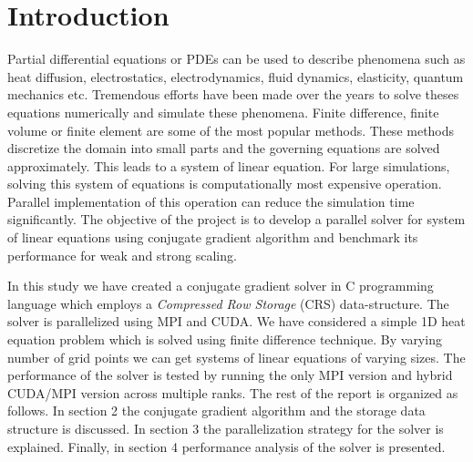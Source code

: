 \documentclass[sigplan,screen]{acmart}
\begin{document}


\maketitle

\section{Introduction}
Partial differential equations or PDEs can be used to describe phenomena such as heat diffusion, electrostatics, electrodynamics, fluid dynamics, elasticity, quantum mechanics etc. Tremendous efforts have been made over the years to solve theses equations numerically and simulate these phenomena. Finite difference, finite volume or finite element are some of the most popular methods. These methods discretize the domain into small parts and the governing equations are solved approximately. This leads to a system of linear equation. For large simulations, solving this system of equations is computationally most expensive operation. Parallel implementation of this operation can reduce the simulation time significantly. The objective of the project is to develop a parallel solver for system of linear equations using conjugate gradient algorithm and benchmark its performance for weak and strong scaling.

In this study we have created a conjugate gradient solver in C programming language which employs a \emph{Compressed Row Storage} (CRS) data-structure. The solver is parallelized using MPI and CUDA. We have considered a simple 1D heat equation problem which is solved using finite difference technique. By varying number of grid points we can get systems of linear equations of varying sizes. The performance of the solver is tested by running the only MPI version and hybrid CUDA/MPI version across multiple ranks. The rest of the report is organized as follows. In section 2 the conjugate gradient algorithm and the storage data structure is discussed. In section 3 the parallelization strategy for the solver is explained. Finally, in section 4 performance analysis of the solver is presented. 
\end{document}
